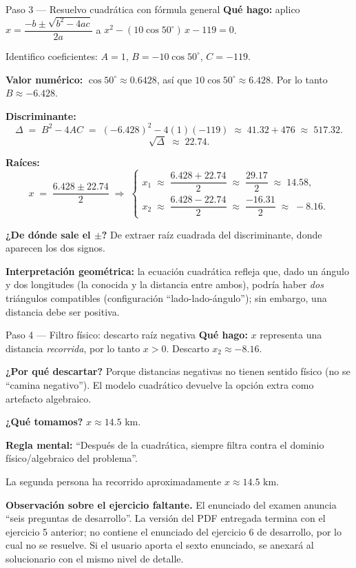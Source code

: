 \documentclass[11pt]{article}
\begin{document}
\begin{paso}{Paso 3 --- Resuelvo cuadrática con fórmula general}
\textbf{Qué hago:} aplico $x=\dfrac{-b\pm\sqrt{b^2-4ac}}{2a}$ a $x^2-(10\cos 50^\circ)\,x-119=0$.

Identifico coeficientes: $A=1$, $B=-10\cos 50^\circ$, $C=-119$.

\textbf{Valor numérico:} $\cos 50^\circ\approx 0.6428$, así que $10\cos 50^\circ\approx 6.428$. Por lo tanto $B\approx -6.428$.

\textbf{Discriminante:}
\[
\Delta \;=\; B^2-4AC \;=\; (-6.428)^2 - 4(1)(-119) \;\approx\; 41.32 + 476 \;\approx\; 517.32.
\]
\[
\sqrt{\Delta} \;\approx\; 22.74.
\]

\textbf{Raíces:}
\[
x \;=\; \dfrac{6.428\pm 22.74}{2} \;\Longrightarrow\;
\begin{cases}
x_1 \;\approx\; \dfrac{6.428+22.74}{2} \;\approx\; \dfrac{29.17}{2} \;\approx\; 14.58,\\[6pt]
x_2 \;\approx\; \dfrac{6.428-22.74}{2} \;\approx\; \dfrac{-16.31}{2} \;\approx\; -8.16.
\end{cases}
\]

\textbf{¿De dónde sale el $\pm$?} De extraer raíz cuadrada del discriminante, donde aparecen los dos signos.

\textbf{Interpretación geométrica:} la ecuación cuadrática refleja que, dado un ángulo y dos longitudes (la conocida y la distancia entre ambos), podría haber \emph{dos} triángulos compatibles (configuración ``lado-lado-ángulo''); sin embargo, una distancia debe ser positiva.
\end{paso}

\begin{paso}{Paso 4 --- Filtro físico: descarto raíz negativa}
\textbf{Qué hago:} $x$ representa una distancia \emph{recorrida}, por lo tanto $x>0$. Descarto $x_2\approx -8.16$.

\textbf{¿Por qué descartar?} Porque distancias negativas no tienen sentido físico (no se ``camina negativo''). El modelo cuadrático devuelve la opción extra como artefacto algebraico.

\textbf{¿Qué tomamos?} $x\approx 14.5$ km.

\textbf{Regla mental:} ``Después de la cuadrática, siempre filtra contra el dominio físico/algebraico del problema''.
\end{paso}

\begin{resp}
La segunda persona ha recorrido aproximadamente $\boxed{x\approx 14.5\text{ km}}$.
\end{resp}

\vspace{1em}
\begin{nota}
\textbf{Observación sobre el ejercicio faltante.} El enunciado del examen anuncia ``seis preguntas de desarrollo''. La versión del PDF entregada termina con el ejercicio 5 anterior; no contiene el enunciado del ejercicio 6 de desarrollo, por lo cual no se resuelve. Si el usuario aporta el sexto enunciado, se anexará al solucionario con el mismo nivel de detalle.
\end{nota}
\end{document}
